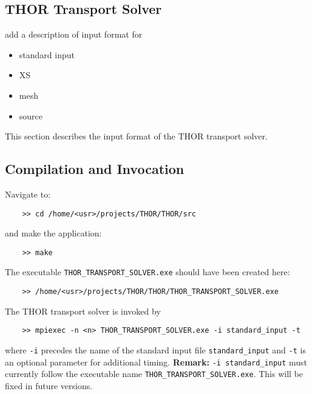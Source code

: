 \subsection{THOR Transport Solver}\label{sec:THOR_format}
add a description of input format for
\begin{itemize}
    \item standard input
    \item XS
    \item mesh
    \item source
\end{itemize}

This section describes the input format of the THOR transport solver. 

\subsection{Compilation and Invocation}
Navigate to:
\begin{verbatim}
    >> cd /home/<usr>/projects/THOR/THOR/src
\end{verbatim}
and make the application:
\begin{verbatim}
    >> make
\end{verbatim}
The executable \verb"THOR_TRANSPORT_SOLVER.exe" should have been created here:
\begin{verbatim}
    >> /home/<usr>/projects/THOR/THOR/THOR_TRANSPORT_SOLVER.exe
\end{verbatim}

The THOR transport solver is invoked by 

\begin{verbatim}
    >> mpiexec -n <n> THOR_TRANSPORT_SOLVER.exe -i standard_input -t
\end{verbatim}
where \verb"-i" precedes the name of the standard input file \verb"standard_input" and \verb"-t" is an optional parameter
for additional timing. 
\noindent\textbf{Remark:} \verb"-i standard_input" must currently follow the executable name \verb"THOR_TRANSPORT_SOLVER.exe". This will be fixed in future versions.

